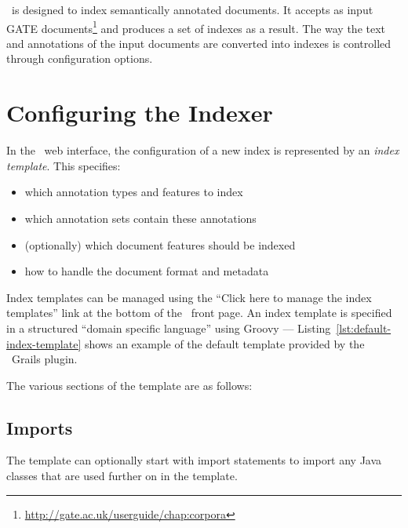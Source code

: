 \Mimir\ is designed to index semantically annotated documents. It accepts as
input GATE documents\footnote{\url{http://gate.ac.uk/userguide/chap:corpora}}
and produces a set of indexes as a result. The way the text and annotations of
the input documents are converted into indexes is controlled through
configuration options.

\section{Configuring the Indexer}\label{sec:indexing:templates}

In the \Mimir\ web interface, the configuration of a new index is represented
by an {\em index template}.  This specifies:
\begin{itemize}
\item which annotation types and features to index
\item which annotation sets contain these annotations
\item (optionally) which document features should be indexed
\item how to handle the document format and metadata
\end{itemize}

Index templates can be managed using the ``Click here to manage the index
templates'' link at the bottom of the \Mimir\ front page.  An index template is
specified in a structured ``domain specific language'' using Groovy ---
Listing~\ref{lst:default-index-template} shows an example of the default
template provided by the \Mimir\ Grails plugin.
%
%
\newcommand{\defaultIndexTemplate}[1][]{{%
}}%
%
\defaultIndexTemplate[float=htb,%
    caption={The default index template provided with \Mimir},%
    label=lst:default-index-template,%
]

{\newpage}
The various sections of the template are as follows:

\subsection*{Imports}
\defaultIndexTemplate[linerange=1-4,firstnumber=1]

The template can optionally start with import statements to import any Java
classes that are used further on in the template.

